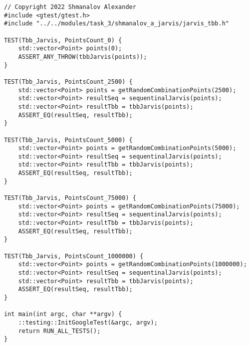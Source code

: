 \documentclass{report}
\begin{document}
\begin{lstlisting}
// Copyright 2022 Shmanalov Alexander
#include <gtest/gtest.h>
#include "../../modules/task_3/shmanalov_a_jarvis/jarvis_tbb.h"

TEST(Tbb_Jarvis, PointsCount_0) {
    std::vector<Point> points(0);
    ASSERT_ANY_THROW(tbbJarvis(points));
}

TEST(Tbb_Jarvis, PointsCount_2500) {
    std::vector<Point> points = getRandomCombinationPoints(2500);
    std::vector<Point> resultSeq = sequentinalJarvis(points);
    std::vector<Point> resultTbb = tbbJarvis(points);
    ASSERT_EQ(resultSeq, resultTbb);
}

TEST(Tbb_Jarvis, PointsCount_5000) {
    std::vector<Point> points = getRandomCombinationPoints(5000);
    std::vector<Point> resultSeq = sequentinalJarvis(points);
    std::vector<Point> resultTbb = tbbJarvis(points);
    ASSERT_EQ(resultSeq, resultTbb);
}

TEST(Tbb_Jarvis, PointsCount_75000) {
    std::vector<Point> points = getRandomCombinationPoints(75000);
    std::vector<Point> resultSeq = sequentinalJarvis(points);
    std::vector<Point> resultTbb = tbbJarvis(points);
    ASSERT_EQ(resultSeq, resultTbb);
}

TEST(Tbb_Jarvis, PointsCount_1000000) {
    std::vector<Point> points = getRandomCombinationPoints(1000000);
    std::vector<Point> resultSeq = sequentinalJarvis(points);
    std::vector<Point> resultTbb = tbbJarvis(points);
    ASSERT_EQ(resultSeq, resultTbb);
}

int main(int argc, char **argv) {
    ::testing::InitGoogleTest(&argc, argv);
    return RUN_ALL_TESTS();
}
\end{lstlisting}
\end{document}
